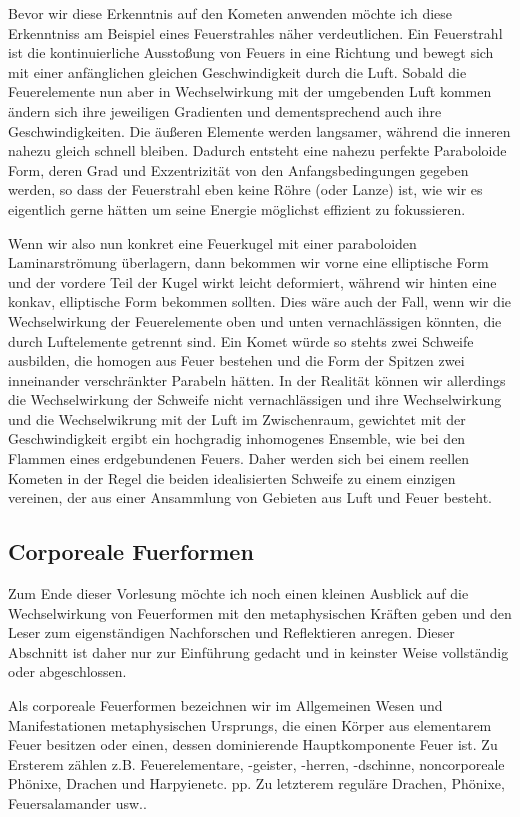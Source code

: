 \documentclass[a5paper,8pt]{book}
\begin{document}
Bevor wir diese Erkenntnis auf den Kometen anwenden möchte ich diese Erkenntniss am Beispiel eines Feuerstrahles näher 
verdeutlichen. Ein Feuerstrahl ist die kontinuierliche Ausstoßung von Feuers in eine Richtung und bewegt sich mit einer 
anfänglichen gleichen Geschwindigkeit durch die Luft. Sobald die Feuerelemente nun aber in Wechselwirkung mit der umgebenden
Luft kommen ändern sich ihre jeweiligen Gradienten und dementsprechend auch ihre Geschwindigkeiten. Die äußeren Elemente 
werden langsamer, während die inneren nahezu gleich schnell bleiben. Dadurch entsteht eine nahezu perfekte Paraboloide 
Form, deren Grad und Exzentrizität von den Anfangsbedingungen gegeben werden, so dass der Feuerstrahl eben keine Röhre 
(oder Lanze) ist, wie wir es eigentlich gerne hätten um seine Energie möglichst effizient zu fokussieren.

Wenn wir also nun konkret eine Feuerkugel mit einer paraboloiden Laminarströmung überlagern, dann bekommen wir vorne eine 
elliptische Form und der vordere Teil der Kugel wirkt leicht deformiert, während wir hinten eine konkav, elliptische Form 
bekommen sollten. Dies wäre auch der Fall, wenn wir die Wechselwirkung der Feuerelemente oben und unten vernachlässigen 
könnten, die durch Luftelemente getrennt sind. Ein Komet würde so stehts zwei Schweife ausbilden, die homogen aus Feuer 
bestehen und die Form der Spitzen zwei inneinander verschränkter Parabeln hätten.
In der Realität können wir allerdings die Wechselwirkung der Schweife nicht vernachlässigen und ihre Wechselwirkung und die 
Wechselwikrung mit der Luft im Zwischenraum, gewichtet mit der Geschwindigkeit ergibt ein hochgradig inhomogenes Ensemble,
wie bei den Flammen eines erdgebundenen Feuers. Daher werden sich bei einem reellen Kometen in der Regel die beiden 
idealisierten Schweife zu einem einzigen vereinen, der aus einer Ansammlung von Gebieten aus Luft und Feuer besteht.

\subsection{Corporeale Fuerformen}

Zum Ende dieser Vorlesung möchte ich noch einen kleinen Ausblick auf die Wechselwirkung von Feuerformen mit den 
metaphysischen Kräften geben und den Leser zum eigenständigen Nachforschen und Reflektieren anregen. Dieser Abschnitt 
ist daher nur zur Einführung gedacht und in keinster Weise vollständig oder abgeschlossen.

Als corporeale Feuerformen bezeichnen wir im Allgemeinen Wesen und Manifestationen metaphysischen Ursprungs, die einen 
Körper aus elementarem Feuer besitzen oder einen, dessen dominierende Hauptkomponente Feuer ist. Zu Ersterem zählen z.B. 
Feuerelementare, -geister, -herren, -dschinne, noncorporeale Phönixe, Drachen und Harpyien\footnotemark[5] etc. pp. Zu letzterem reguläre 
Drachen, Phönixe, Feuersalamander usw..
\end{document}
